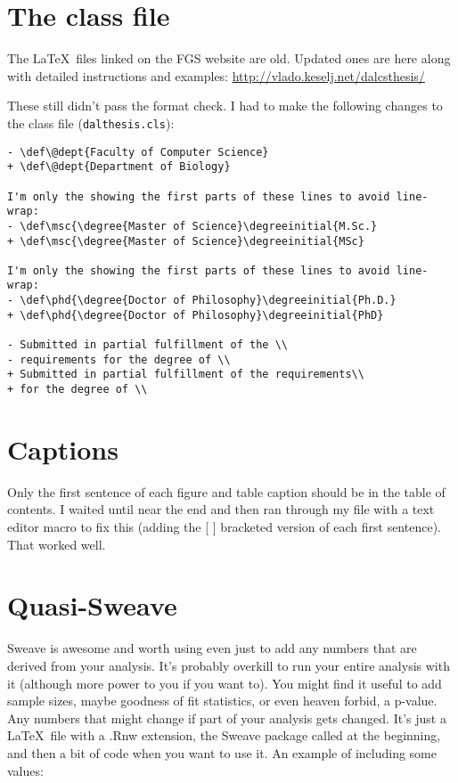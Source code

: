 \documentclass[12pt]{article}
\begin{document}
\section{The class file}
The \LaTeX\ files linked on the FGS website are old. Updated ones are here along with detailed instructions and examples:
\url{http://vlado.keselj.net/dalcsthesis/}

These still didn't pass the format check. I had to make the following changes to the class file (\verb#dalthesis.cls#):

\begin{verbatim}
- \def\@dept{Faculty of Computer Science}
+ \def\@dept{Department of Biology}

I'm only the showing the first parts of these lines to avoid line-wrap:
- \def\msc{\degree{Master of Science}\degreeinitial{M.Sc.}
+ \def\msc{\degree{Master of Science}\degreeinitial{MSc}

I'm only the showing the first parts of these lines to avoid line-wrap:
- \def\phd{\degree{Doctor of Philosophy}\degreeinitial{Ph.D.}
+ \def\phd{\degree{Doctor of Philosophy}\degreeinitial{PhD}

- Submitted in partial fulfillment of the \\
- requirements for the degree of \\
+ Submitted in partial fulfillment of the requirements\\
+ for the degree of \\
\end{verbatim}


\section{Captions}
Only the first sentence of each figure and table caption should be in the table of contents. I waited until near the end and then ran through my file with a text editor macro to fix this (adding the [ ] bracketed version of each first sentence). That worked well.

\section{Quasi-Sweave}
Sweave is awesome and worth using even just to add any numbers that are derived from your analysis. It's probably overkill to run your entire analysis with it (although more power to you if you want to). You might find it useful to add sample sizes, maybe goodness of fit statistics, or even heaven forbid, a p-value. Any numbers that might change if part of your analysis gets changed. It's just a \LaTeX\ file with a .Rnw extension, the Sweave package called at the beginning, and then a bit of code when you want to use it. An example of including some values:
\end{document}
